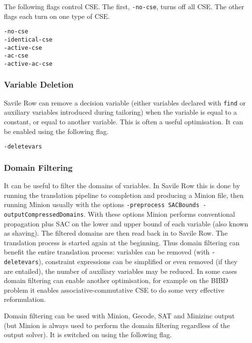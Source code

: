 \documentclass[a4paper]{article}
\newcommand{\savilerow}{{\sc Savile Row}\xspace}
\begin{document}
The following flags control CSE. The first, \texttt{-no-cse}, turns off all CSE. 
The other flags each turn on one type of CSE. 

\begin{verbatim}
-no-cse
-identical-cse
-active-cse
-ac-cse
-active-ac-cse
\end{verbatim}

\subsubsection*{Variable Deletion}

\savilerow can remove a decision variable (either variables declared with \texttt{find} or
auxiliary variables introduced during tailoring) when the variable is equal to a 
constant, or equal to another variable. This is often a useful optimisation. It can be
enabled using the following flag. 

\begin{verbatim}
-deletevars
\end{verbatim}

\subsubsection*{Domain Filtering}

\begin{sloppypar}
It can be useful to filter the domains of variables. In \savilerow this is done by
running the translation pipeline to completion and producing a Minion file, then 
running Minion usually with the options \texttt{-preprocess SACBounds -outputCompressedDomains}.
With these options Minion performs conventional propagation plus SAC on the 
lower and upper bound of each variable (also known as shaving). The filtered
domains are then read back in to \savilerow. The translation process is started again
at the beginning.  Thus domain filtering can benefit the entire translation process:
variables can be removed (with \texttt{-deletevars}), constraint expressions can be
simplified or even removed (if they are entailed), the number of auxiliary variables may be reduced.
In some cases domain filtering can enable another optimisation, for example on
the BIBD problem it enables associative-commutative CSE to do some very effective
reformulation. 
\end{sloppypar}

Domain filtering can be used with Minion, Gecode, SAT and Minizinc output (but Minion
is always used to perform the domain filtering regardless of the output solver). It is 
switched on using the following flag. 
\end{document}
